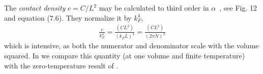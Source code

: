 The \emph{contact density} $c=C/L^2$ may be calculated to third order in $\alpha$~\cite{Beane:2022wcn}, see Fig. 12 and equation (7.6).
They normalize it by $k_F^4$,
\begin{align}
    \frac{c}{k_F^4} = \frac{(CL^2)}{(k_F L)^4} = \frac{(CL^2)}{(2\pi N)^2}
    \label{eq:contact density}
\end{align}
which is intensive, as both the numerator and denominator scale with the volume squared.
In  we compare this quantity (at one volume and finite temperature) with the zero-temperature result of .
